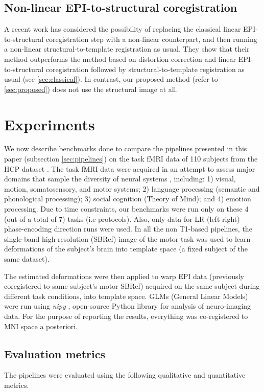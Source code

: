 \subsection{Non-linear EPI-to-structural coregistration}
A recent work \cite{wang2017} has considered the possibility of replacing the classical
linear EPI-to-structural coregistration step with a non-linear counterpart,
and then running a non-linear structural-to-template registration as usual.
They show that their method outperforms the method based on distortion correction
and linear EPI-to-structural coregistration followed by structural-to-template
registration as usual (see \ref{sec:classical}). In contrast, our proposed
method (refer to \ref{sec:proposed}) does not use the structural image at all.


\section{Experiments}
\label{sec:exp}
We now describe benchmarks done to compare the pipelines presented in
this paper (subsection \ref{sec:pipelines}) on the task fMRI data of
110 subjects from the HCP dataset \cite{VanEssen20122222}. 
The task fMRI data were acquired in an attempt to assess major domains
that
sample the diversity of neural systems
, including: 1) visual, motion,
somatosensory, and motor systems; 2) language processing (semantic and
phonological processing); 3) social cognition (Theory of Mind); and 4)
emotion processing.
Due to time constraints, our benchmarks were run only on these 4 (out
of a total of 7) tasks (i.e protocols). Also, only data for LR (left-right)
phase-encoding direction \cite{chang1992technique} runs were used. In all the non T1-based
pipelines, the single-band high-resolution (SBRef) image of the motor
task was used to learn deformations of the subject's brain into
template space (a fixed subject of the same dataset).

The estimated
deformations were then applied to warp EPI data (previously
coregistered to same subject's motor SBRef) acquired on the same
subject during different task conditions, into template space.
GLMs (General Linear Models) \cite{friston1994statistical} were run
using \textit{nipy} \cite{Gorgolewski2011}, open-source Python library for analysis of neuro-imaging data. For the purpose of reporting the results, everything was co-registered to MNI space a posteriori.

\subsection{Evaluation metrics}
The pipelines were evaluated using the following qualitative and quantitative
metrics.

